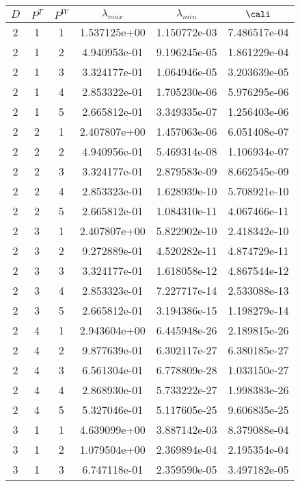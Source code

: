 \documentclass{article}
\begin{document}
{\begin{small}
\begin{table}
\begin{center}
\begin{tabular}{|ccc|ccc|} \hline
 $D$ & $P^T$  & $P^W$  & $\lambda_{max}$ & $\lambda_{min}$   & $\cali$ \\
 \hline
2 & 1 & 1 &  1.537125e+00 & 1.150772e-03 & 7.486517e-04 \\ 
2 & 1 & 2 &  4.940953e-01 & 9.196245e-05 & 1.861229e-04 \\ 
2 & 1 & 3 &  3.324177e-01 & 1.064946e-05 & 3.203639e-05 \\ 
2 & 1 & 4 &  2.853322e-01 & 1.705230e-06 & 5.976295e-06 \\ 
2 & 1 & 5 &  2.665812e-01 & 3.349335e-07 & 1.256403e-06 \\ 
2 & 2 & 1 &  2.407807e+00 & 1.457063e-06 & 6.051408e-07 \\ 
2 & 2 & 2 &  4.940956e-01 & 5.469314e-08 & 1.106934e-07 \\ 
2 & 2 & 3 &  3.324177e-01 & 2.879583e-09 & 8.662545e-09 \\ 
2 & 2 & 4 &  2.853323e-01 & 1.628939e-10 & 5.708921e-10 \\ 
2 & 2 & 5 &  2.665812e-01 & 1.084310e-11 & 4.067466e-11 \\ 
2 & 3 & 1 &  2.407807e+00 & 5.822902e-10 & 2.418342e-10 \\ 
2 & 3 & 2 &  9.272889e-01 & 4.520282e-11 & 4.874729e-11 \\ 
2 & 3 & 3 &  3.324177e-01 & 1.618058e-12 & 4.867544e-12 \\ 
2 & 3 & 4 &  2.853323e-01 & 7.227717e-14 & 2.533088e-13 \\ 
2 & 3 & 5 &  2.665812e-01 & 3.194386e-15 & 1.198279e-14 \\ 
2 & 4 & 1 &  2.943604e+00 & 6.445948e-26 & 2.189815e-26 \\ 
2 & 4 & 2 &  9.877639e-01 & 6.302117e-27 & 6.380185e-27 \\ 
2 & 4 & 3 &  6.561304e-01 & 6.778809e-28 & 1.033150e-27 \\ 
2 & 4 & 4 &  2.868930e-01 & 5.733222e-27 & 1.998383e-26 \\ 
2 & 4 & 5 &  5.327046e-01 & 5.117605e-25 & 9.606835e-25 \\
\hline
3 & 1 & 1 & 4.639099e+00 & 3.887142e-03 & 8.379088e-04 \\ 
3 & 1 & 2 & 1.079504e+00 & 2.369894e-04 & 2.195354e-04 \\ 
3 & 1 & 3 & 6.747118e-01 & 2.359590e-05 & 3.497182e-05 \\ 

\end{tabular}
\end{center}
\end{table}
\end{small}}
\end{document}
